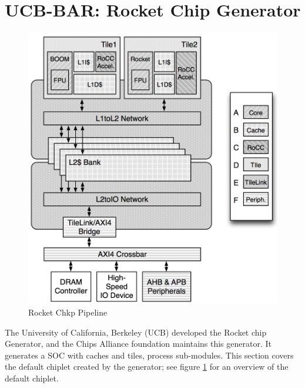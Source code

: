 \documentclass[../main.tex]{subfiles}
\begin{document}
\section{UCB-BAR: Rocket Chip Generator}
\begin{figure}
    \centering
    \includegraphics[scale=.35]{pngs/RocketChipGeneratorLayout.png}
    \caption{Rocket Chkp Pipeline\cite{Asanović:EECS-2016-17}}
    \label{fig:RocketCipGen}
\end{figure}
The University of California, Berkeley (UCB) developed the Rocket chip Generator, and the Chips Alliance foundation maintains this generator\cite{Chips-Alliance}. It generates a SOC with caches and tiles, process sub-modules. This section covers the default chiplet created by the generator; see figure \ref{fig:RocketCipGen} for an overview of the default chiplet.
\end{document}

